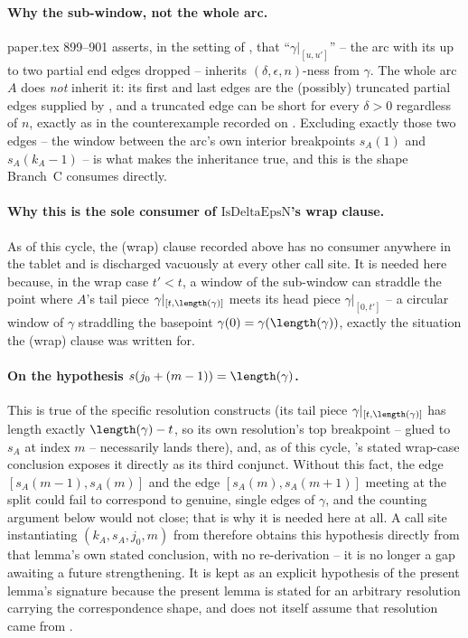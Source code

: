 \begin{lemma}
  \paragraph{Why the sub-window, not the whole arc.} paper.tex 899--901 asserts, in the setting of
  , that ``$\gamma|_{[u,u']}$'' -- the arc with its up to two partial
  end edges dropped -- inherits $(\delta,\epsilon,n)$-ness from $\gamma$. The whole arc $A$ does
  \emph{not} inherit it: its first and last edges are the (possibly) truncated partial edges
  supplied by , and a truncated edge can be short for every
  $\delta>0$ regardless of $n$, exactly as in the counterexample recorded on
  . Excluding exactly those two edges -- the window between
  the arc's own interior breakpoints $s_A(1)$ and $s_A(k_A-1)$ -- is what makes the inheritance
  true, and this is the shape  Branch~C consumes directly.

  \paragraph{Why this is the sole consumer of $\mathrm{IsDeltaEpsN}$'s wrap clause.} As of this
  cycle, the (wrap) clause recorded above has no consumer anywhere in the tablet and is discharged
  vacuously at every other call site. It is needed here because, in the wrap case $t'<t$, a window
  of the sub-window can straddle the point where $A$'s tail piece $\gamma|_{[t,\length(\gamma)]}$
  meets its head piece $\gamma|_{[0,t']}$ -- a circular window of $\gamma$ straddling the basepoint
  $\gamma(0)=\gamma(\length(\gamma))$, exactly the situation the (wrap) clause was written for.

  \paragraph{On the hypothesis $s(j_0+(m-1))=\length(\gamma)$.} This is true of the specific
  resolution  constructs (its tail piece $\gamma|_{[t,\length(\gamma)]}$
  has length exactly $\length(\gamma)-t$, so its own resolution's top breakpoint -- glued to $s_A$ at
  index $m$ -- necessarily lands there), and, as of this cycle, 's
  stated wrap-case conclusion exposes it directly as its third conjunct. Without this fact, the edge
  $[s_A(m-1),s_A(m)]$ and the edge $[s_A(m),s_A(m+1)]$ meeting at the split could fail to correspond
  to genuine, single edges of $\gamma$, and the counting argument below would not close; that is why
  it is needed here at all. A call site instantiating $(k_A,s_A,j_0,m)$ from
   therefore obtains this hypothesis directly from that lemma's own
  stated conclusion, with no re-derivation -- it is no longer a gap awaiting a future
  strengthening. It is kept as an explicit hypothesis of the present lemma's signature because the
  present lemma is stated for an arbitrary resolution carrying the correspondence shape, and does
  not itself assume that resolution came from .


\end{lemma}
